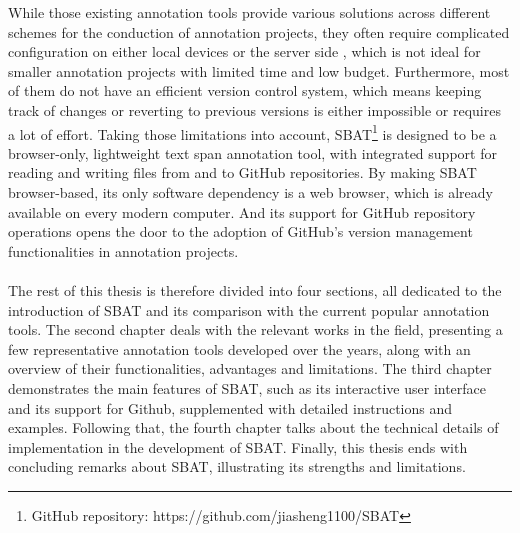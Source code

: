 \documentclass[12ptm a4paper]{article}
\begin{document}
While those existing annotation tools provide various solutions across different schemes for the conduction of annotation projects, they often require complicated configuration on either local devices or the server side \citep{yang2018yeddalightweightcollaborativetext}, which is not ideal for smaller annotation projects with limited time and low budget. Furthermore, most of them do not have an efficient version control system, which means keeping track of changes or reverting to previous versions is either impossible or requires a lot of effort. Taking those limitations into account, SBAT\footnote{GitHub repository: https://github.com/jiasheng1100/SBAT} is designed to be a browser-only, lightweight text span annotation tool, with integrated support for reading and writing files from and to GitHub repositories. By making SBAT browser-based, its only software dependency is a web browser, which is already available on every modern computer. And its support for GitHub repository operations opens the door to the adoption of GitHub's version management functionalities in annotation projects.\\
\\
The rest of this thesis is therefore divided into four sections, all dedicated to the introduction of SBAT and its comparison with the current popular annotation tools. The second chapter deals with the relevant works in the field, presenting a few representative annotation tools developed over the years, along with an overview of their functionalities, advantages and limitations. The third chapter demonstrates the main features of SBAT, such as its interactive user interface and its support for Github, supplemented with detailed instructions and examples. Following that, the fourth chapter talks about the technical details of implementation in the development of SBAT. Finally, this thesis ends with concluding remarks about SBAT, illustrating its strengths and limitations.


\newpage
\end{document}
